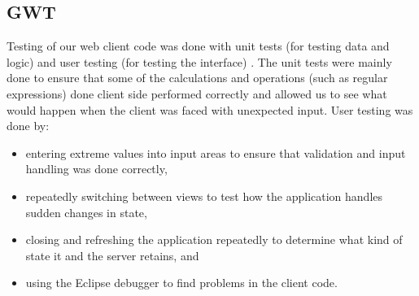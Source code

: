 \subsection{GWT}
Testing of our web client code was done with unit tests (for testing data and
logic) and user testing (for testing the interface) . The unit tests were mainly
done to ensure that some of the calculations and operations (such as regular
expressions) done client side performed correctly and allowed us to see what would happen when the client was
faced with unexpected input. 
User testing was done by:
\begin{itemize}
\item entering extreme values into input areas to ensure that validation and
  input handling was done correctly,
\item repeatedly switching between views to test how the application handles
  sudden changes in state,
\item closing and refreshing the application repeatedly to determine what kind
  of state it and the server retains, and
  \item using the Eclipse debugger to find problems in the client code. 
\end{itemize} 
